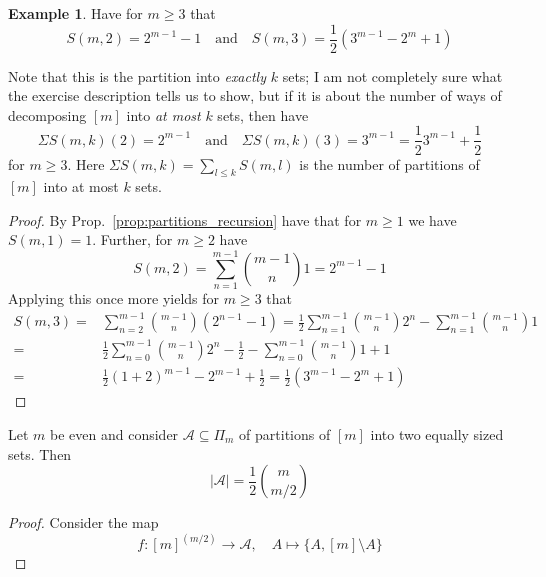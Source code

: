 \documentclass{scrartcl}
\theoremstyle{definition}
\newtheorem{example}[definition]{Example}
\begin{document}
\begin{example}
    \label{ex:partitions_have_no_lym}
    Have for $m \geq 3$ that
    \begin{equation*}
        S(m, 2) = 2^{m - 1} - 1 \quad \text{and} \quad S(m, 3) = \frac 1 2 (3^{m - 1} - 2^m + 1)
    \end{equation*}

    Note that this is the partition into \emph{exactly} $k$ sets; 
    I am not completely sure what the exercise description tells us to show, but if it is about the number of ways of decomposing $[m]$ into \emph{at most} $k$ sets, then have
    \begin{equation*}
        \Sigma S(m, k)(2) = 2^{m - 1} \quad \text{and} \quad \Sigma S(m, k)(3) = 3^{m - 1} = \frac 1 2 3^{m - 1} + \frac 1 2
    \end{equation*}
    for $m \geq 3$.
    Here $\Sigma S(m, k) = \sum_{l \leq k} S(m, l)$ is the number of partitions of $[m]$ into at most $k$ sets.
    \begin{proof}
        By Prop.~\ref{prop:partitions_recursion} have that for $m \geq 1$ we have $S(m, 1) = 1$.
        Further, for $m \geq 2$ have
        \begin{equation*}
            S(m, 2) = \sum_{n = 1}^{m - 1} {m - 1 \choose n} 1 = 2^{m - 1} - 1
        \end{equation*}
        Applying this once more yields for $m \geq 3$ that
        \begin{align*}
            S(m, 3) =& \sum_{n = 2}^{m - 1} {m - 1 \choose n} (2^{n - 1} - 1) = \frac 1 2 \sum_{n = 1}^{m - 1} {m - 1 \choose n} 2^n - \sum_{n = 1}^{m - 1} {m - 1 \choose n} 1 \\
            =&\frac 1 2 \sum_{n = 0}^{m - 1} {m - 1 \choose n} 2^n - \frac 1 2 - \sum_{n = 0}^{m - 1} {m - 1 \choose n} 1 + 1 \\
            =& \frac 1 2 (1 + 2)^{m - 1} - 2^{m - 1} + \frac 1 2 = \frac 1 2 (3^{m - 1} - 2^m + 1)
        \end{align*}
    \end{proof}
    Let $m$ be even and consider $\mathcal{A} \subseteq \Pi_m$ of partitions of $[m]$ into two equally sized sets.
    Then
    \begin{equation*}
        |\mathcal{A}| = \frac 1 2 {m \choose m/2}
    \end{equation*}
    \begin{proof}
        Consider the map
        \begin{equation*}
            f: [m]^{(m/2)} \to \mathcal{A}, \quad A \mapsto \{ A, [m] \setminus A \}

\end{equation*}
\end{proof}
\end{example}
\end{document}
